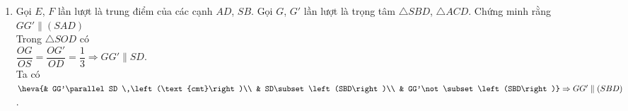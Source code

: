 \begin{bt}
{\begin{enumerate}
{}
			\item Gọi $E$, $F$ lần lượt là trung điểm của các cạnh $AD$, $SB$. Gọi $G$, $G'$ lần lượt là trọng tâm $\triangle SBD$, $\triangle ACD$. Chứng minh rằng $GG'\parallel \left(SAD\right)$\\
			Trong $\triangle SOD$ có\\
			$\dfrac{OG}{OS}=\dfrac{OG'}{OD}=\dfrac{1}{3}\Rightarrow GG'\parallel SD$.\\
			Ta có $\heva{& GG'\parallel SD \,\left(\text{cmt}\right)\\ 
				& SD\subset\left(SBD\right)\\ 
				& GG'\not\subset\left(SBD\right)}\Rightarrow GG'\parallel \left(SBD\right)$.
		\end{enumerate}
	}
\end{bt}

